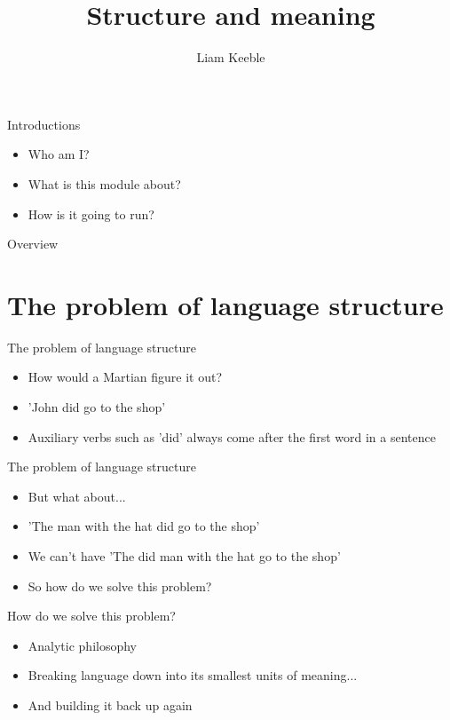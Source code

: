 \documentclass{beamer}
\title{Structure and meaning}
\author{Liam Keeble}
\institute{School of English Literature, Language and Linguistics}
\date{}
\begin{document}
\frame{\titlepage}

\begin{frame}{Introductions}
\begin{itemize}
\item Who am I?
\item What is this module about?
\item How is it going to run?
\end{itemize}
\end{frame}

\begin{frame}{Overview}
\tableofcontents
\end{frame}



\section{The problem of language structure}

\begin{frame}{The problem of language structure}
	\begin{itemize}
	\item How would a Martian figure it out?
	\item 'John did go to the shop'
	\item Auxiliary verbs such as 'did' always come after the first word in a sentence
	\end{itemize}
\end{frame}

\begin{frame}{The problem of language structure}
	\begin{itemize}
	\item But what about...
	\item 'The man with the hat did go to the shop'
	\item We can't have 'The did man with the hat go to the shop'
	\item So how do we solve this problem?
	\end{itemize}

\end{frame}

\begin{frame}{How do we solve this problem?}
	\begin{itemize}
	\item Analytic philosophy
	\item Breaking language down into its smallest units of meaning...
	\item And building it back up again
	\end{itemize}

\end{frame}
\end{document}
